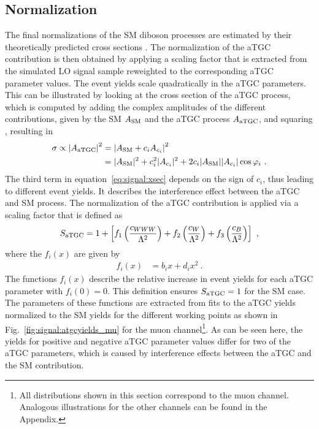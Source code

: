 \subsection*{Normalization}
The final normalizations of the SM diboson processes are estimated by their theoretically predicted cross sections \cite{WWxsec,WZxsec}. The normalization of the aTGC contribution is then obtained by applying a scaling factor that is extracted from the simulated LO signal sample reweighted to the corresponding aTGC parameter values. The event yields scale quadratically in the aTGC parameters. This can be illustrated by looking at the cross section of the aTGC process, which is computed by adding the complex amplitudes of the different contributions, given by the SM $A_{\rm SM}$ and the aTGC process $A_{\rm aTGC}$, and squaring \cite{EFT}, resulting in
\begin{align}
\sigma \propto \left| A_{\rm aTGC}\right|^2 &= \left| A_{\rm SM} + c_i A_{c_i} \right|^2 \\
&= |A_{\rm SM}|^2 + c_i^2  |A_{c_i}|^2 + 2c_i  |A_{\rm SM}| |A_{c_i}|\cos \varphi_i ~. \label{eq:signal:xsec} 
\end{align}
The third term in equation~\ref{eq:signal:xsec} depends on the sign of $c_i$, thus leading to different event yields. It describes the interference effect between the aTGC and SM process. The normalization of the aTGC contribution is applied via a scaling factor that is defined as
\begin{equation}
S_{\rm aTGC} = 1 + \left[ f_1\left(\frac{c_{WWW}}{\Lambda^2}\right) + f_2\left(\frac{c_{W}}{\Lambda^2}\right) + f_3\left(\frac{c_{B}}{\Lambda^2}\right) \right] ~,
\end{equation}
where the $f_i(x)$ are given by
\begin{align}
f_i(x) &= b_i x + d_i x^2 ~. \label{eq:signal:scale}
\end{align}
The functions $f_i(x)$ describe the relative increase in event yields for each aTGC parameter with $f_i(0)=0$. This definition ensures $S_{\rm aTGC}=1$ for the SM case. The parameters of these functions are extracted from fits to the aTGC yields normalized to the SM yields for the different working points as shown in Fig.~\ref{fig:signal:atgcyields_mu} for the muon channel\footnote{All distributions shown in this section correspond to the muon channel. Analogous illustrations for the other channels can be found in the Appendix.}. As can be seen here, the yields for positive and negative aTGC parameter values differ for two of the aTGC parameters, which is caused by interference effects between the aTGC and the SM contribution.

